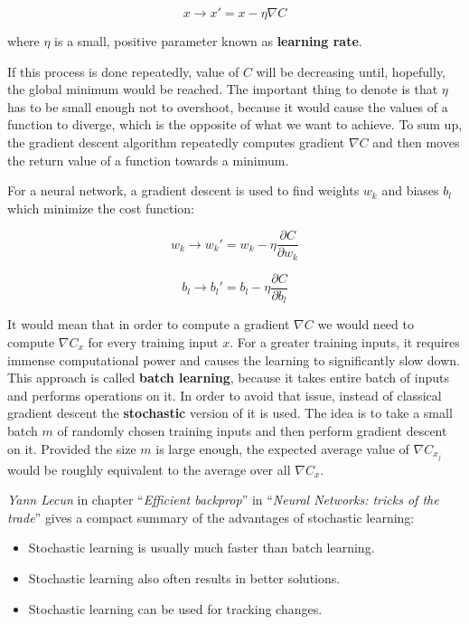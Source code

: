 \begin{equation}
x \longrightarrow x' = x - \eta \nabla C
\end{equation}

where $\eta$ is a small, positive parameter known as \textbf{learning rate}.

If this process is done repeatedly, value of $C$ will be decreasing until, hopefully, the global minimum would be reached. The important thing to denote is that $\eta$ has to be small enough not to overshoot, because it would cause the values of a function to diverge, which is the opposite of what we want to achieve. To sum up, the gradient descent algorithm repeatedly computes gradient $\nabla C$ and then moves the return value of a function towards a minimum.

\newpage

For a neural network, a gradient descent is used to find weights $w_k$ and biases $b_l$ which minimize the cost function:

\begin{equation}
    w_k \longrightarrow w_k' = w_k - \eta \frac{\partial C}{\partial w_k}
\end{equation}

\begin{equation}
    b_l \longrightarrow b_l' = b_l - \eta \frac{\partial C}{\partial b_l}
\end{equation}

It would mean that in order to compute a gradient $\nabla C$ we would need to compute $\nabla C_x$ for every training input $x$. For a greater training inputs, it requires immense computational power and causes the learning to significantly slow down. This approach is called \textbf{batch learning}, because it takes entire batch of inputs and performs operations on it. In order to avoid that issue, instead of classical gradient descent the \textbf{stochastic} version of it is used. The idea is to take a small batch $m$ of randomly chosen training inputs and then perform gradient descent on it. Provided the size $m$ is large enough, the expected average value of $\nabla C_{x_j}$ would be roughly equivalent to the average over all $\nabla C_x$.

\emph{Yann Lecun} in chapter ``\emph{Efficient backprop}'' in ``\emph{Neural Networks: tricks of the trade}'' \cite{EfficientBackProp} gives a compact summary of the advantages of stochastic learning:

\begin{itemize}
    \item Stochastic learning is usually much faster than batch learning.
    \item Stochastic learning also often results in better solutions.
    \item Stochastic learning can be used for tracking changes.
\end{itemize}

